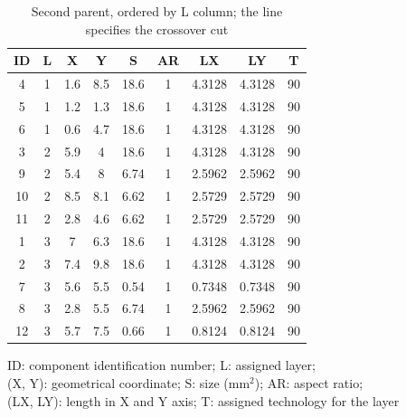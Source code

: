 \begin{table}[pt]
\caption{Second parent, ordered by L column; the line specifies the crossover cut}
\begin{center}
\begin{scriptsize}
\begin{tabular}{|c|c|c|c|c|c|c|c|c|}
\hline ID & L & X & Y & S & AR & LX & LY & T\\
\hline 4 & 1 & 1.6 & 8.5 & 18.6 & 1 & 4.3128 & 4.3128 & 90\\
5 & 1 & 1.2 & 1.3 & 18.6 & 1 & 4.3128 & 4.3128 & 90\\
6 & 1 & 0.6 & 4.7 & 18.6 & 1 & 4.3128 & 4.3128 & 90\\
3 & 2 & 5.9 & 4 & 18.6 & 1 & 4.3128 & 4.3128 & 90\\
9 & 2 & 5.4 & 8 & 6.74 & 1 & 2.5962 & 2.5962 & 90\\
10 & 2 & 8.5 & 8.1 & 6.62 & 1 & 2.5729 & 2.5729 & 90\\
11 & 2 & 2.8 & 4.6 & 6.62 & 1 & 2.5729 & 2.5729 & 90\\
\hline
\hline
1 & 3 & 7 & 6.3 & 18.6 & 1 & 4.3128 & 4.3128 & 90\\
2 & 3 & 7.4 & 9.8 & 18.6 & 1 & 4.3128 & 4.3128 & 90\\
7 & 3 & 5.6 & 5.5 & 0.54 & 1 & 0.7348 & 0.7348 & 90\\
8 & 3 & 2.8 & 5.5 & 6.74 & 1 & 2.5962 & 2.5962 & 90\\
12 & 3 & 5.7 & 7.5 & 0.66 & 1 & 0.8124 & 0.8124 & 90\\
\hline
\end{tabular}
\end{scriptsize}
\end{center}
\begin{center}
\begin{scriptsize}
ID: component identification number; L: assigned layer;\\
(X, Y): geometrical coordinate; S: size (mm$^2$); AR: aspect ratio;\\
(LX, LY): length in X and Y axis; T: assigned technology for the layer
\end{scriptsize}
\end{center}
\label{tab:secondparentLrow}
\end{table}

